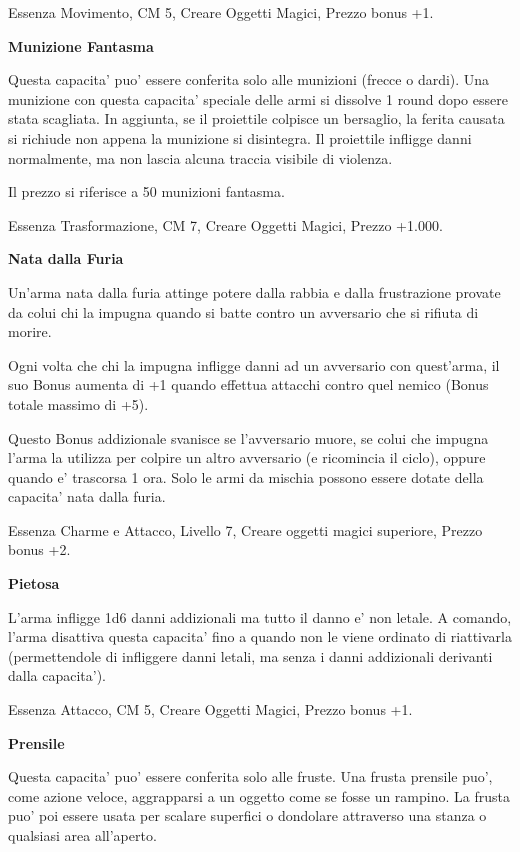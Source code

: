 \documentclass[a4paper,11pt,twoside,openany]{book}
\begin{document}
{		Essenza Movimento, CM 5, Creare Oggetti Magici, Prezzo bonus +1.
		
		\textbf{Munizione Fantasma}
		
		Questa capacita' puo' essere conferita solo alle munizioni (frecce o dardi). Una munizione con questa capacita' speciale delle armi si dissolve 1 round dopo essere stata scagliata. In aggiunta, se il proiettile colpisce un bersaglio, la ferita causata si richiude non appena la munizione si disintegra. Il proiettile infligge danni normalmente, ma non lascia alcuna traccia visibile di violenza.
		
		Il prezzo si riferisce a 50 munizioni fantasma.
		
		Essenza Trasformazione, CM 7, Creare Oggetti Magici, Prezzo +1.000.
		
		\textbf{Nata dalla Furia}
		
		Un'arma nata dalla furia attinge potere dalla rabbia e dalla frustrazione provate da colui chi la impugna quando si batte contro un avversario che si rifiuta di morire.
		
		Ogni volta che chi la impugna infligge danni ad un avversario con quest'arma, il suo Bonus aumenta di +1 quando effettua attacchi contro quel nemico (Bonus totale massimo di +5).
		
		Questo Bonus addizionale svanisce se l'avversario muore, se colui che impugna l'arma la utilizza per colpire un altro avversario (e ricomincia il ciclo), oppure quando e' trascorsa 1 ora. Solo le armi da mischia possono essere dotate della capacita' nata dalla furia.
		
		Essenza Charme e Attacco, Livello 7, Creare oggetti magici superiore, Prezzo bonus +2.
		
		\textbf{Pietosa}
		
		L'arma infligge 1d6 danni addizionali ma tutto il danno e' non letale. A comando, l'arma disattiva questa capacita' fino a quando non le viene ordinato di riattivarla (permettendole di infliggere danni letali, ma senza i danni addizionali derivanti dalla capacita').
		
		Essenza Attacco, CM 5, Creare Oggetti Magici, Prezzo bonus +1.
		
		\textbf{Prensile}
		
		Questa capacita' puo' essere conferita solo alle fruste. Una frusta prensile puo', come azione veloce, aggrapparsi a un oggetto come se fosse un rampino. La frusta puo' poi essere usata per scalare superfici o dondolare attraverso una stanza o qualsiasi area all'aperto.
		
}
\end{document}
